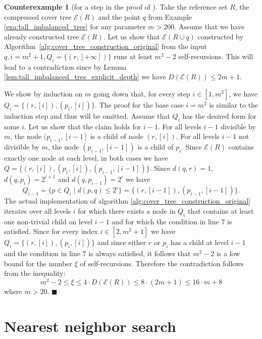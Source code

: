 \documentclass{vgtc}                          %
\numberwithin{algocf}{section}
\theoremstyle{definition}
\theoremstyle{definition}
\theoremstyle{definition}
\newtheorem{cexa}[algocf]{Counterexample}
\theoremstyle{plain}
\newcommand{\T}{\mathcal{E}}
\newcommand{\bs}{\hfill $\blacksquare$}
\begin{document}
\begin{cexa}[for a step in the proof of {\cite[Theorem~6]{beygelzimer2006cover}}]
\medskip	
\noindent	
	Take the reference set $R$, the compressed cover tree $\T(R)$ and the point $q$ from Example \ref{exa:tall_imbalanced_tree} for any parameter $m > 200$. 
	Assume that we have already constructed tree $\T(R)$. 
	Let us show that $\T(R \cup q)$ constructed by Algorithm~\ref{alg:cover_tree_construction_original} from the input $q, i = m^2+1, Q_i = \{(r,[+\infty])\}$ runs at least $m^2-2$ self-recursions. 
	This will lead to a contradiction since by Lemma \ref{lem:tall_imbalanced_tree_explicit_depth} we have $D(\T(R)) \leq 2m + 1$.
	
	\medskip
	\noindent
	We show by induction on $m$ going down that, for every step $i \in [1, m^2]$, we have $Q_i = \{(r,[i]),(p_i,[i])\}$. 
	The proof for the base case $i = m^2$ is similar to the induction step and thus will be omitted. 
	Assume that $Q_{i}$ has the desired form for some $i$.
	Let us show that the claim holds for $i-1$. 
	For all levels $i-1$ divisible by $m$, the node $(p_{i-1},[i-1]$ is a child of node $(r,[i])$. 
	For all levels $i-1$ not divisible by $m$, the node $(p_{i-1}, [i-1])$ is a child of $p_i$. 
	Since $\T(R)$ contains exactly one node at each level, in both cases we have $Q = \{(r,[i]), (p_{i},[i]), 
	(p_{i-1}, [i-1])\}$. 
	Since $d(q,r) = 1$, $d(q,p_{i}) = 2^{i+1}$ and $d(q,p_{i-1}) = 2^{i}$  we have 
	$$Q_{i-1} = \{p \in Q_i \mid d(p,q) \leq 2^i\} = \{(r , [i-1]),(p_{i-1}, [i-1])\}.$$
	\medskip
	\noindent
	The actual implementation of algorithm \ref{alg:cover_tree_construction_original} iterates over all levels $i$ for which there exists a node in $Q_i$  that contains at least one non-trivial child on level $i-1$ and for which the condition in line $7$ is satisfied. Since for every index $i \in [2,m^2+1]$ we have $Q_i = \{(r,[i]),(p_i,[i])\}$ and since either $r$ or $p_{i}$ has a child at level $i-1$ and the condition in line $7$ is always satisfied, it follows that $m^2-2$ is a low bound for the number $\xi$ of self-recursions. 
	Therefore the contradiction follows from the inequality:
	$$m^2-2 \leq  \xi \leq 4 \cdot D(\T(R)) \leq 8 \cdot (2m + 1) \leq 16 \cdot m + 8$$
	where $m > 20$. 
	\bs
	
	
\end{cexa}


\section{Nearest neighbor search}
\label{sec:nn_glich}
\end{document}
